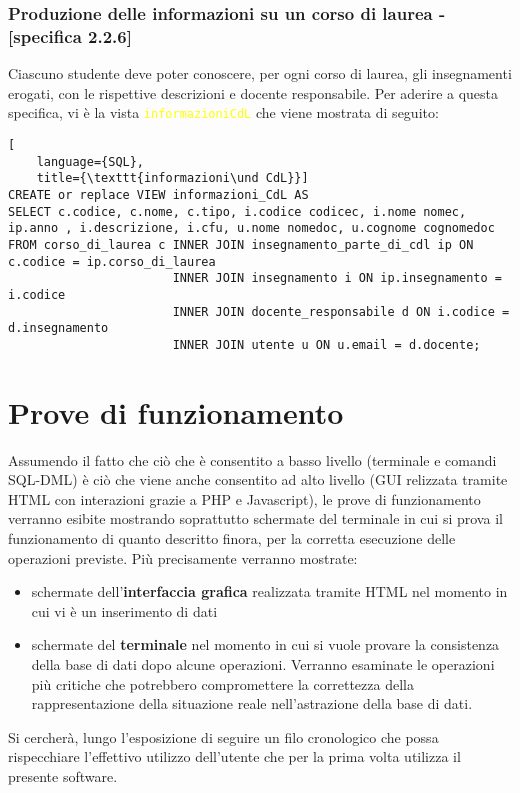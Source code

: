 \documentclass{article}
\newcommand{\sqlview}[1]{\texttt{\textcolor{yellow}{#1}}}
\newcommand{\und}[0]{\textunderscore}
\begin{document}
\subsubsection{Produzione delle informazioni su un corso di laurea - [specifica 2.2.6]}
Ciascuno studente deve poter conoscere, per ogni corso di laurea, gli insegnamenti erogati, con le rispettive descrizioni e docente responsabile. Per aderire a questa specifica, vi è la vista \sqlview{informazioni\und CdL} che viene mostrata di seguito:
\begin{lstlisting}[
    language={SQL},
    title={\texttt{informazioni\und CdL}}]
CREATE or replace VIEW informazioni_CdL AS
SELECT c.codice, c.nome, c.tipo, i.codice codicec, i.nome nomec, ip.anno , i.descrizione, i.cfu, u.nome nomedoc, u.cognome cognomedoc
FROM corso_di_laurea c INNER JOIN insegnamento_parte_di_cdl ip ON c.codice = ip.corso_di_laurea
                       INNER JOIN insegnamento i ON ip.insegnamento = i.codice
                       INNER JOIN docente_responsabile d ON i.codice = d.insegnamento
                       INNER JOIN utente u ON u.email = d.docente;
\end{lstlisting}
\section{Prove di funzionamento}
Assumendo il fatto che ciò che è consentito a basso livello (terminale e comandi SQL-DML) è ciò che viene anche consentito ad alto livello (GUI relizzata tramite HTML con interazioni grazie a PHP e Javascript), le prove di funzionamento verranno esibite mostrando soprattutto schermate del terminale in cui si prova il funzionamento di quanto descritto finora, per la corretta esecuzione delle operazioni previste. Più precisamente verranno mostrate:
\begin{itemize}
    \item schermate dell'\textbf{interfaccia grafica} realizzata tramite HTML nel momento in cui vi è un inserimento di dati
    \item schermate del \textbf{terminale} nel momento in cui si vuole provare la consistenza della base di dati dopo alcune operazioni. Verranno esaminate le operazioni più critiche che potrebbero compromettere la correttezza della rappresentazione della situazione reale nell'astrazione della base di dati.
\end{itemize}
Si cercherà, lungo l'esposizione di seguire un filo cronologico che possa rispecchiare l'effettivo utilizzo dell'utente che per la prima volta utilizza il presente software.
\end{document}
